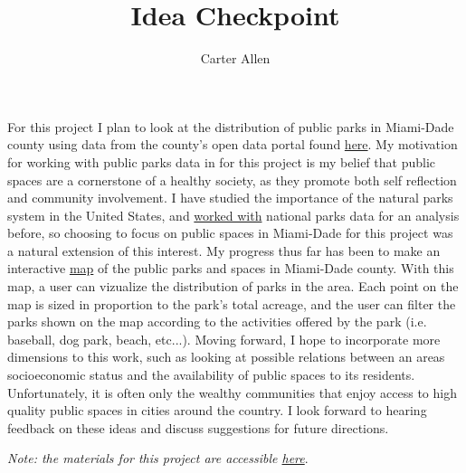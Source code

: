 \documentclass[12pt]{article}
\title{Idea Checkpoint}
\author{Carter Allen}
\begin{document}
\maketitle
\raggedright

For this project I plan to look at the distribution of public parks in Miami-Dade county using data from the county's open data portal found \href{https://opendata.miamidade.gov/Infrastructure/Parks-Facities/wjhr-nx6u}{here}. My motivation for working with public parks data in for this project is my belief that public spaces are a cornerstone of a healthy society, as they promote both self reflection and community involvement. I have studied the importance of the natural parks system in the United States, and \href{https://sufficientlyminimal.netlify.com/2018/01/28/congaree-big-trees/}{worked with} national parks data for an analysis before, so choosing to focus on public spaces in Miami-Dade for this project was a natural extension of this interest. My progress thus far has been to make an interactive \href{https://carter-allen.shinyapps.io/Miami_Parks/}{map} of the public parks and spaces in Miami-Dade county. With this map, a user can vizualize the distribution of parks in the area. Each point on the map is sized in proportion to the park's total acreage, and the user can filter the parks shown on the map according to the activities offered by the park (i.e. baseball, dog park, beach, etc...). Moving forward, I hope to incorporate more dimensions to this work, such as looking at possible relations between an areas socioeconomic status and the availability of public spaces to its residents. Unfortunately, it is often only the wealthy communities that enjoy access to high quality public spaces in cities around the country. I look forward to hearing feedback on these ideas and discuss suggestions for future directions.

\textit{Note: the materials for this project are accessible \href{https://carter-allen.github.io/VizUM/}{here}}.
\end{document}
